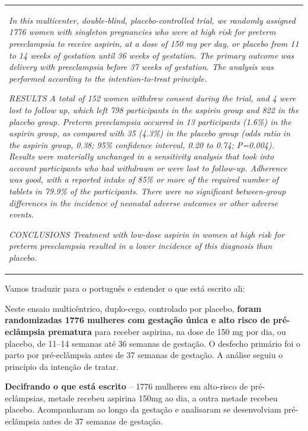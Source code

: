\documentclass[
  letterpaper,
  DIV=11,
  numbers=noendperiod]{scrreprt}
\begin{document}
\begin{longtable}[]{@{}
  >{\raggedright\arraybackslash}p{}@{}}
\toprule\noalign{}
\endhead
\bottomrule\noalign{}
\endlastfoot
\emph{In this multicenter, double-blind, placebo-controlled trial, we
randomly assigned 1776 women with singleton pregnancies who were at high
risk for preterm preeclampsia to receive aspirin, at a dose of 150 mg
per day, or placebo from 11 to 14 weeks of gestation until 36 weeks of
gestation. The primary outcome was delivery with preeclampsia before 37
weeks of gestation. The analysis was performed according to the
intention-to-treat principle.}

\emph{RESULTS A total of 152 women withdrew consent during the trial,
and 4 were lost to follow up, which left 798 participants in the aspirin
group and 822 in the placebo group. Preterm preeclampsia occurred in 13
participants (1.6\%) in the aspirin group, as compared with 35 (4.3\%)
in the placebo group (odds ratio in the aspirin group, 0.38; 95\%
confidence interval, 0.20 to 0.74; P=0.004). Results were materially
unchanged in a sensitivity analysis that took into account participants
who had withdrawn or were lost to follow-up. Adherence was good, with a
reported intake of 85\% or more of the required number of tablets in
79.9\% of the participants. There were no significant between-group
differences in the incidence of neonatal adverse outcomes or other
adverse events.}

\emph{CONCLUSIONS Treatment with low-dose aspirin in women at high risk
for preterm preeclampsia resulted in a lower incidence of this diagnosis
than placebo.} \\
\end{longtable}

Vamos traduzir para o português e entender o que está escrito ali:

Neste ensaio multicêntrico, duplo-cego, controlado por placebo,
\textbf{foram randomizadas 1776 mulheres com gestação única e alto risco
de pré-eclâmpsia prematura} para receber aspirina, na dose de 150 mg por
dia, ou placebo, de 11--14 semanas até 36 semanas de gestação. O
desfecho primário foi o parto por pré-eclâmpsia antes de 37 semanas de
gestação. A análise seguiu o princípio da intenção de tratar.

\textbf{Decifrando o que está escrito} -- 1776 mulheres em alto-risco de
pré-eclâmpsias, metade recebeu aspirina 150mg ao dia, a outra metade
recebeu placebo. Acompanharam ao longo da gestação e analisaram se
desenvolviam pré-eclâmpsia antes de 37 semanas de gestação.
\end{document}
